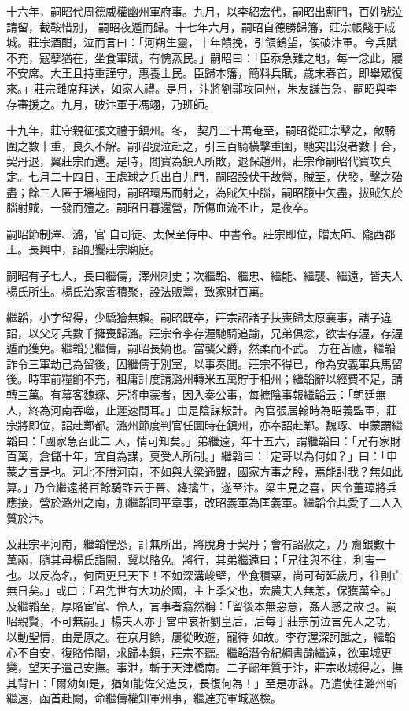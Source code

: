 \begin{pinyinscope}
 十六年，嗣昭代周德威權幽州軍府事。九月，以李紹宏代，嗣昭出薊門，百姓號泣請留，截鞍惜別，
 嗣昭夜遁而歸。十七年六月，嗣昭自德勝歸籓，莊宗帳餞于戚城。莊宗酒酣，泣而言曰：「河朔生靈，十年饋挽，引領鶴望，俟破汴軍。今兵賦不充，寇孽猶在，坐食軍賦，有愧蒸民。」嗣昭曰：「臣忝急難之地，每一念此，寢不安席。大王且持重謹守，惠養士民。臣歸本籓，簡料兵賦，歲末春首，即舉眾復來。」莊宗離席拜送，如家人禮。是月，汴將劉鄩攻同州，朱友謙告急，嗣昭與李存審援之。九月，破汴軍于馮翊，乃班師。



 十九年，莊守親征張文禮于鎮州。冬，
 契丹三十萬奄至，嗣昭從莊宗擊之，敵騎圍之數十重，良久不解。嗣昭號泣赴之，引三百騎橫擊重圍，馳突出沒者數十合，契丹退，翼莊宗而還。是時，閻寶為鎮人所敗，退保趙州，莊宗命嗣昭代寶攻真定。七月二十四日，王處球之兵出自九門，嗣昭設伏于故營，賊至，伏發，擊之殆盡；餘三人匿于墻墟間，嗣昭環馬而射之，為賊矢中腦，嗣昭箙中矢盡，拔賊矢於腦射賊，一發而殪之。嗣昭日暮還營，所傷血流不止，是夜卒。



 嗣昭節制澤、潞，官
 自司徒、太保至侍中、中書令。莊宗即位，贈太師、隴西郡王。長興中，詔配饗莊宗廟庭。



 嗣昭有子七人，長曰繼儔，澤州刺史；次繼韜、繼忠、繼能、繼襲、繼遠，皆夫人楊氏所生。楊氏治家善積聚，設法販鬻，致家財百萬。



 繼韜，小字留得，少驕獪無賴。嗣昭既卒，莊宗詔諸子扶喪歸太原襄事，諸子違詔，以父牙兵數千擁喪歸潞。莊宗令李存渥馳騎追諭，兄弟俱忿，欲害存渥，存渥遁而獲免。繼韜兄繼儔，嗣昭長嫡也。當襲父爵，然柔而不武。
 方在苫廬，繼韜詐令三軍劫己為留後，囚繼儔于別室，以事奏聞。莊宗不得已，命為安義軍兵馬留後。時軍前糧餉不充，租庸計度請潞州轉米五萬貯于相州；繼韜辭以經費不足，請轉三萬。有幕客魏琢、牙將申蒙者，因入奏公事，每摭陰事報繼韜云：「朝廷無人，終為河南吞噬，止遲速間耳。」由是陰謀叛計。內官張居翰時為昭義監軍，莊宗將即位，詔赴鄴都。潞州節度判官任圜時在鎮州，亦奉詔赴鄴。魏琢、申蒙謂繼韜曰：「國家急召此二
 人，情可知矣。」弟繼遠，年十五六，謂繼韜曰：「兄有家財百萬，倉儲十年，宜自為謀，莫受人所制。」繼韜曰：「定哥以為何如？」曰：「申蒙之言是也。河北不勝河南，不如與大梁通盟，國家方事之殷，焉能討我？無如此算。」乃令繼遠將百餘騎詐云于晉、絳擒生，遂至汴。梁主見之喜，因令董璋將兵應接，營於潞州之南，加繼韜同平章事，改昭義軍為匡義軍。繼韜令其愛子二人入質於汴。



 及莊宗平河南，繼韜惶恐，計無所出，將脫身于契丹；會有詔赦之，乃
 齎銀數十萬兩，隨其母楊氏詣闕，冀以賂免。將行，其弟繼遠曰；「兄往與不往，利害一也。以反為名，何面更見天下！不如深溝峻壁，坐食積粟，尚可茍延歲月，往則亡無日矣。」或曰：「君先世有大功於國，主上季父也，宏農夫人無恙，保獲萬全。」及繼韜至，厚賂宦官、伶人，言事者翕然稱：「留後本無惡意，姦人惑之故也。嗣昭親賢，不可無嗣。」楊夫人亦于宮中哀祈劉皇后，后每于莊宗前泣言先人之功，以動聖情，由是原之。在京月餘，屢從畋遊，寵待
 如故。李存渥深訶詆之，繼韜心不自安，復賂伶閹，求歸本鎮，莊宗不聽。繼韜潛令紀綱書諭繼遠，欲軍城更變，望天子遣己安撫。事泄，斬于天津橋南。二子齠年質于汴，莊宗收城得之，撫其背曰：「爾幼如是，猶如能佐父造反，長復何為！」至是亦誅。乃遣使往潞州斬繼遠，函首赴闕，命繼儔權知軍州事，繼達充軍城巡檢。




\end{pinyinscope}
